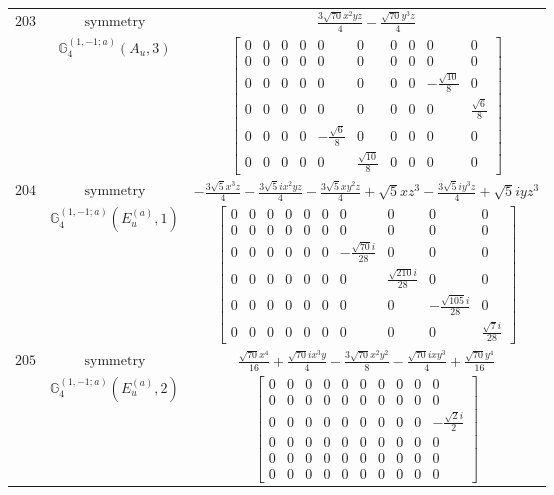 \documentclass[fleqn,8pt,landscape]{jsarticle}
\begin{document}
\begin{longtable}{ccc}
$ 203 $ & $ \text{symmetry} $ & $ \frac{3 \sqrt{70} x^{2} y z}{4} - \frac{\sqrt{70} y^{3} z}{4} $ \\
$  $ & $ \mathbb{G}_{4}^{(1,-1;a)}(A_{u},3) $ & $ \begin{bmatrix} 0 & 0 & 0 & 0 & 0 & 0 & 0 & 0 & 0 & 0 \\ 0 & 0 & 0 & 0 & 0 & 0 & 0 & 0 & 0 & 0 \\ 0 & 0 & 0 & 0 & 0 & 0 & 0 & 0 & - \frac{\sqrt{10}}{8} & 0 \\ 0 & 0 & 0 & 0 & 0 & 0 & 0 & 0 & 0 & \frac{\sqrt{6}}{8} \\ 0 & 0 & 0 & 0 & - \frac{\sqrt{6}}{8} & 0 & 0 & 0 & 0 & 0 \\ 0 & 0 & 0 & 0 & 0 & \frac{\sqrt{10}}{8} & 0 & 0 & 0 & 0 \end{bmatrix} $ \\ \hline
$ 204 $ & $ \text{symmetry} $ & $ - \frac{3 \sqrt{5} x^{3} z}{4} - \frac{3 \sqrt{5} i x^{2} y z}{4} - \frac{3 \sqrt{5} x y^{2} z}{4} + \sqrt{5} x z^{3} - \frac{3 \sqrt{5} i y^{3} z}{4} + \sqrt{5} i y z^{3} $ \\
$  $ & $ \mathbb{G}_{4}^{(1,-1;a)}(E_{u}^{(a)},1) $ & $ \begin{bmatrix} 0 & 0 & 0 & 0 & 0 & 0 & 0 & 0 & 0 & 0 \\ 0 & 0 & 0 & 0 & 0 & 0 & 0 & 0 & 0 & 0 \\ 0 & 0 & 0 & 0 & 0 & 0 & - \frac{\sqrt{70} i}{28} & 0 & 0 & 0 \\ 0 & 0 & 0 & 0 & 0 & 0 & 0 & \frac{\sqrt{210} i}{28} & 0 & 0 \\ 0 & 0 & 0 & 0 & 0 & 0 & 0 & 0 & - \frac{\sqrt{105} i}{28} & 0 \\ 0 & 0 & 0 & 0 & 0 & 0 & 0 & 0 & 0 & \frac{\sqrt{7} i}{28} \end{bmatrix} $ \\ \hline
$ 205 $ & $ \text{symmetry} $ & $ \frac{\sqrt{70} x^{4}}{16} + \frac{\sqrt{70} i x^{3} y}{4} - \frac{3 \sqrt{70} x^{2} y^{2}}{8} - \frac{\sqrt{70} i x y^{3}}{4} + \frac{\sqrt{70} y^{4}}{16} $ \\
$  $ & $ \mathbb{G}_{4}^{(1,-1;a)}(E_{u}^{(a)},2) $ & $ \begin{bmatrix} 0 & 0 & 0 & 0 & 0 & 0 & 0 & 0 & 0 & 0 \\ 0 & 0 & 0 & 0 & 0 & 0 & 0 & 0 & 0 & 0 \\ 0 & 0 & 0 & 0 & 0 & 0 & 0 & 0 & 0 & - \frac{\sqrt{2} i}{2} \\ 0 & 0 & 0 & 0 & 0 & 0 & 0 & 0 & 0 & 0 \\ 0 & 0 & 0 & 0 & 0 & 0 & 0 & 0 & 0 & 0 \\ 0 & 0 & 0 & 0 & 0 & 0 & 0 & 0 & 0 & 0 \end{bmatrix} $ \\ \hline

\end{longtable}
\end{document}
